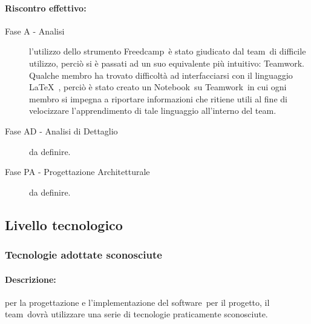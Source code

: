 \documentclass[../PianoProgetto.tex]{subfiles}
\begin{document}
	\newpage
	\paragraph*{Riscontro effettivo:} 
		\begin{description}
			\item[Fase A - Analisi] l'utilizzo dello strumento Freedcamp\g\ è stato giudicato dal team\g\ di difficile utilizzo, perciò si è passati ad un suo equivalente più intuitivo: Teamwork\g .
	Qualche membro ha trovato difficoltà ad interfacciarsi con il linguaggio \LaTeX\  , perciò è stato creato un Notebook\g\ su Teamwork\g\ in cui ogni membro si impegna a riportare informazioni che ritiene utili al fine di velocizzare l'apprendimento di tale linguaggio all'interno del team\g .
			\item[Fase AD - Analisi di Dettaglio] da definire.
			\item[Fase PA - Progettazione Architetturale] da definire.
		\end{description}
		
\subsection{Livello tecnologico}

\subsubsection{Tecnologie adottate sconosciute}

	\paragraph*{Descrizione:} per la progettazione e l'implementazione del software\g\ per il progetto, il team\g\ dovrà utilizzare una serie di tecnologie praticamente sconosciute.
	
\end{document}
